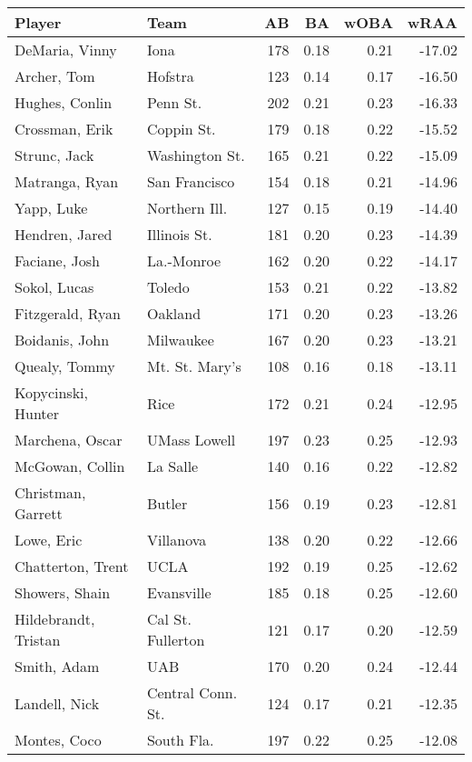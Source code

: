 \documentclass[12pt]{article}
\begin{document}
	
	\begin{table}[ht]
		\centering
		\begin{tabular}{llrrrr}
			\hline
			Player & Team & AB & BA & wOBA & wRAA \\ 
			\hline
			DeMaria, Vinny & Iona & 178 & 0.18 & 0.21 & -17.02 \\ 
			Archer, Tom & Hofstra & 123 & 0.14 & 0.17 & -16.50 \\ 
			Hughes, Conlin & Penn St. & 202 & 0.21 & 0.23 & -16.33 \\ 
			Crossman, Erik & Coppin St. & 179 & 0.18 & 0.22 & -15.52 \\ 
			Strunc, Jack & Washington St. & 165 & 0.21 & 0.22 & -15.09 \\ 
			Matranga, Ryan & San Francisco & 154 & 0.18 & 0.21 & -14.96 \\ 
			Yapp, Luke & Northern Ill. & 127 & 0.15 & 0.19 & -14.40 \\ 
			Hendren, Jared & Illinois St. & 181 & 0.20 & 0.23 & -14.39 \\ 
			Faciane, Josh & La.-Monroe & 162 & 0.20 & 0.22 & -14.17 \\ 
			Sokol, Lucas & Toledo & 153 & 0.21 & 0.22 & -13.82 \\ 
			Fitzgerald, Ryan & Oakland & 171 & 0.20 & 0.23 & -13.26 \\ 
			Boidanis, John & Milwaukee & 167 & 0.20 & 0.23 & -13.21 \\ 
			Quealy, Tommy & Mt. St. Mary's & 108 & 0.16 & 0.18 & -13.11 \\ 
			Kopycinski, Hunter & Rice & 172 & 0.21 & 0.24 & -12.95 \\ 
			Marchena, Oscar & UMass Lowell & 197 & 0.23 & 0.25 & -12.93 \\ 
			McGowan, Collin & La Salle & 140 & 0.16 & 0.22 & -12.82 \\ 
			Christman, Garrett & Butler & 156 & 0.19 & 0.23 & -12.81 \\ 
			Lowe, Eric & Villanova & 138 & 0.20 & 0.22 & -12.66 \\ 
			Chatterton, Trent & UCLA & 192 & 0.19 & 0.25 & -12.62 \\ 
			Showers, Shain & Evansville & 185 & 0.18 & 0.25 & -12.60 \\ 
			Hildebrandt, Tristan & Cal St. Fullerton & 121 & 0.17 & 0.20 & -12.59 \\ 
			Smith, Adam & UAB & 170 & 0.20 & 0.24 & -12.44 \\ 
			Landell, Nick & Central Conn. St. & 124 & 0.17 & 0.21 & -12.35 \\ 
			Montes, Coco & South Fla. & 197 & 0.22 & 0.25 & -12.08 \\ 
			\hline
		\end{tabular}
	\end{table}
	
\end{document}
